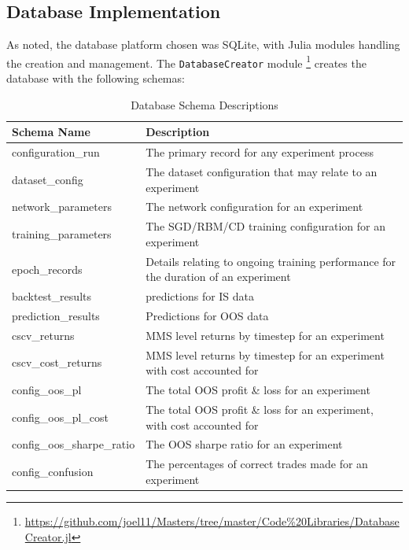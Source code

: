 \documentclass[a4paper,11pt,oneside]{article}
\theoremstyle{plain}
\theoremstyle{definition}
\begin{document}
	\subsection{Database Implementation}
	
	As noted, the database platform chosen was SQLite, with Julia modules handling the creation and management. The \texttt{DatabaseCreator} module \footnote{\url{https://github.com/joel11/Masters/tree/master/Code\%20Libraries/DatabaseCreator.jl}} creates the database with the following schemas:
	
	\begin{table}[h]
		\begin{tabular}{|p{0.3\linewidth}|p{0.7\linewidth}|}
			\hline
			\textbf{Schema Name} &\textbf{Description}  \\\hline	
			{configuration\_run} & {The primary record for any experiment process} \\\hline
			{dataset\_config} & {The dataset configuration that may relate to an experiment} \\\hline
			{network\_parameters} & {The network configuration for an experiment} \\\hline
			{training\_parameters} & {The SGD/RBM/CD training configuration for an experiment}  \\\hline
			{epoch\_records} & {Details relating to ongoing training performance for the duration of an experiment}  \\\hline
			{backtest\_results} & {predictions for IS data}  \\\hline
			{prediction\_results} & {Predictions for OOS data}  \\\hline
			{cscv\_returns} & {MMS level returns by timestep for an experiment}  \\\hline
			{cscv\_cost\_returns} & {MMS level returns by timestep for an experiment with cost accounted for}  \\\hline
			{config\_oos\_pl} & {The total OOS profit \& loss for an experiment}  \\\hline
			{config\_oos\_pl\_cost} & {The total OOS profit \& loss for an experiment, with cost accounted for}  \\\hline
			{config\_oos\_sharpe\_ratio} & {The OOS sharpe ratio for an experiment}  \\\hline
			{config\_confusion} & {The percentages of correct trades made for an experiment}  \\\hline
		\end{tabular}
		\newline\newline
		\caption{Database Schema Descriptions}\label{tab_schemas}
	\end{table}
	
\end{document}
